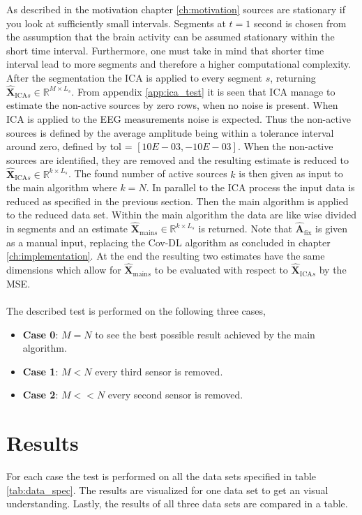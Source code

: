 As described in the motivation chapter \ref{ch:motivation} sources are stationary if you look at sufficiently small intervals. 
Segments at $t = 1$ second is chosen from the assumption that the brain activity can be assumed stationary within the short time interval.
Furthermore, one must take in mind that shorter time interval lead to more segments and therefore a higher computational complexity. 
After the segmentation the ICA is applied to every segment $s$, returning $\hat{\mathbf{X}}_{\text{ICA} s} \in \mathbb{R}^{M \times L_s}$.
From appendix \ref{app:ica_test} it is seen that ICA manage to estimate the non-active sources by zero rows, when no noise is present. 
When ICA is applied to the EEG measurements noise is expected. 
Thus the non-active sources is defined by the average amplitude being within a tolerance interval around zero, defined by tol = $[10E-03, -10E-03]$. 
When the non-active sources are identified, they are removed and the resulting estimate is reduced to $\hat{\mathbf{X}}_{\text{ICA} s} \in \mathbb{R}^{k \times L_s}$. 
The found number of active sources $k$ is then given as input to the main algorithm where $k = N$. 
In parallel to the ICA process the input data is reduced as specified in the previous section. 
Then the main algorithm is applied to the reduced data set. 
Within the main algorithm the data are like wise divided in segments and an estimate $\hat{\mathbf{X}}_{\text{main} s} \in \mathbb{R}^{k \times L_s}$ is returned. 
Note that $\hat{\mathbf{A}}_{\text{fix}}$ is given as a manual input, replacing the Cov-DL algorithm as concluded in chapter \ref{ch:implementation}.
At the end the resulting two estimates have the same dimensions which allow for $\hat{\mathbf{X}}_{\text{main} s}$ to be evaluated with respect to $\hat{\mathbf{X}}_{\text{ICA} s}$ by the MSE. 
\\ \\
The described test is performed on the following three cases,
\begin{itemize}
\item \textbf{Case 0}: $M = N$ to see the best possible result achieved by the main algorithm. 
\item \textbf{Case 1}: $M < N$ every third sensor is removed. 
\item \textbf{Case 2}: $M << N$ every second sensor is removed.
\end{itemize}

\section{Results}
For each case the test is performed on all the data sets specified in table \ref{tab:data_spec}.
The results are visualized for one data set to get an visual understanding.
Lastly, the results of all three data sets are compared in a table.  

